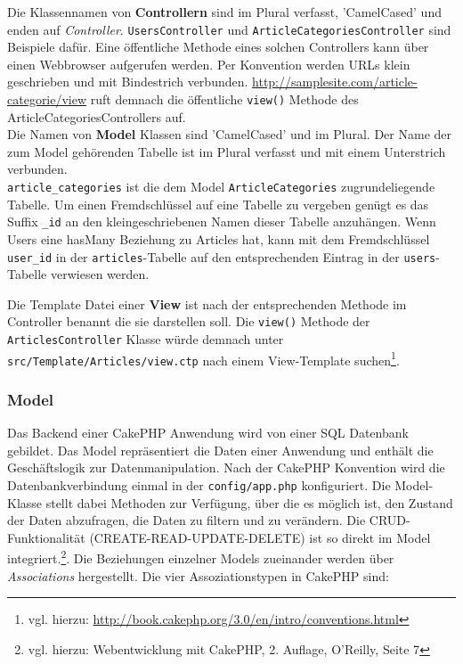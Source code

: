 	 Die Klassennamen von \textbf{Controllern} sind im Plural verfasst, 'CamelCased' und enden auf \textit{Controller}. \texttt{UsersController} und \texttt{ArticleCategoriesController} sind Beispiele dafür. Eine öffentliche Methode eines solchen Controllers kann über einen Webbrowser aufgerufen werden. Per Konvention werden URLs klein geschrieben und mit Bindestrich verbunden.
	\url{http://samplesite.com/article-categorie/view} ruft demnach die öffentliche \texttt{view()} Methode des ArticleCategoriesControllers auf.\\
	\newline
	Die Namen von \textbf{Model} Klassen sind 'CamelCased' und im Plural. Der Name der zum Model gehörenden Tabelle ist im Plural verfasst und mit einem Unterstrich verbunden.\\
	\texttt{article\_categories} ist die dem Model \texttt{ArticleCategories} zugrundeliegende Tabelle. Um einen Fremdschlüssel auf eine Tabelle zu vergeben genügt es das Suffix \texttt{\_id} an den kleingeschriebenen Namen dieser Tabelle anzuhängen. Wenn Users eine hasMany Beziehung zu Articles hat, kann mit dem Fremdschlüssel \texttt{user\_id} in der \texttt{articles}-Tabelle auf den entsprechenden Eintrag in der \texttt{users}-Tabelle verwiesen werden. \newline
	
	Die Template Datei einer \textbf{View} ist nach der entsprechenden Methode im Controller benannt die sie darstellen soll. Die \texttt{view()} Methode der \texttt{ArticlesController} Klasse würde demnach unter \texttt{src/Template/Articles/view.ctp} nach einem View-Template suchen\footnote{vgl. hierzu: \url{http://book.cakephp.org/3.0/en/intro/conventions.html}}.
	
	\subsubsection{Model}
	
	Das Backend einer CakePHP Anwendung wird von einer SQL Datenbank gebildet. Das Model repräsentiert die Daten einer Anwendung und enthält die Geschäftslogik zur Datenmanipulation. Nach der CakePHP Konvention wird die Datenbankverbindung einmal in der \texttt{config/app.php} konfiguriert. Die Model-Klasse stellt dabei Methoden zur Verfügung, über die es möglich ist, den Zustand der Daten abzufragen, die Daten zu filtern und zu verändern. Die CRUD-Funktionalität (CREATE-READ-UPDATE-DELETE) ist so direkt im Model integriert.\footnote{vgl. hierzu: Webentwicklung mit CakePHP, 2. Auflage, O'Reilly, Seite 7}. 
	Die Beziehungen einzelner Models zueinander werden über \textit{Associations} hergestellt. Die vier Assoziationstypen in CakePHP sind:\\

